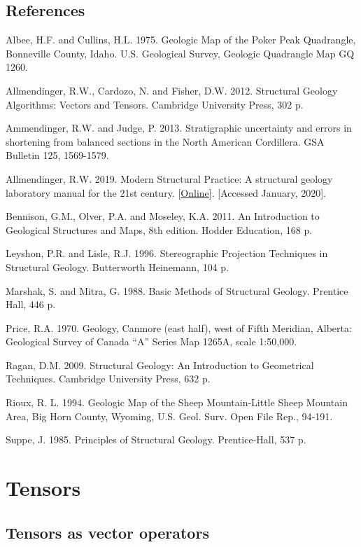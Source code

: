 \documentclass[a4paper , 12pt]{book}
\begin{document}
\section*{References}

Albee, H.F. and Cullins, H.L. 1975. Geologic Map of the Poker Peak Quadrangle, Bonneville County, Idaho. U.S. Geological Survey, Geologic Quadrangle Map GQ 1260. 

Allmendinger, R.W., Cardozo, N. and Fisher, D.W. 2012. Structural Geology Algorithms: Vectors and Tensors. Cambridge University Press, 302 p.

Ammendinger, R.W. and Judge, P. 2013. Stratigraphic uncertainty and errors in shortening from balanced sections in the North American Cordillera. GSA Bulletin 125, 1569-1579.

Allmendinger, R.W. 2019. Modern Structural Practice: A structural geology laboratory manual for the 21st century. [\href{http://www.geo.cornell.edu/geology/faculty/RWA/structure-lab-manual}{Online}]. [Accessed January, 2020].

Bennison, G.M., Olver, P.A. and Moseley, K.A. 2011. An Introduction to Geological Structures and Maps, 8th edition. Hodder Education, 168 p.

Leyshon, P.R. and Lisle, R.J. 1996. Stereographic Projection Techniques in Structural Geology. Butterworth Heinemann, 104 p.

Marshak, S. and Mitra, G. 1988. Basic Methods of Structural Geology. Prentice Hall, 446 p.

Price, R.A. 1970. Geology, Canmore (east half), west of Fifth Meridian, Alberta: Geological Survey of Canada “A” Series Map 1265A, scale 1:50,000.

Ragan, D.M. 2009. Structural Geology: An Introduction to Geometrical Techniques. Cambridge University Press, 632 p.

Rioux, R. L. 1994. Geologic Map of the Sheep Mountain‐Little Sheep Mountain Area, Big Horn County, Wyoming, U.S. Geol. Surv. Open File Rep., 94‐191.

Suppe, J. 1985. Principles of Structural Geology. Prentice-Hall, 537 p.

\chapter{Tensors}

\section{Tensors as vector operators}
\end{document}
